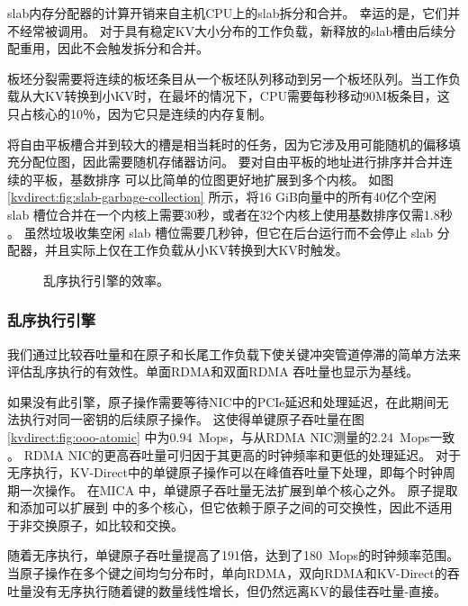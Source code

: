 slab内存分配器的计算开销来自主机CPU上的slab拆分和合并。
幸运的是，它们并不经常被调用。
对于具有稳定KV大小分布的工作负载，新释放的slab槽由后续分配重用，因此不会触发拆分和合并。

板坯分裂需要将连续的板坯条目从一个板坯队列移动到另一个板坯队列。当工作负载从大KV转换到小KV时，在最坏的情况下，CPU需要每秒移动90M板条目，这只占核心的10％，因为它只是连续的内存复制。

将自由平板槽合并到较大的槽是相当耗时的任务，因为它涉及用可能随机的偏移填充分配位图，因此需要随机存储器访问。
要对自由平板的地址进行排序并合并连续的平板，基数排序 \cite {satish2010fast} 可以比简单的位图更好地扩展到多个内核。
如图\ref {kvdirect:fig:slab-garbage-collection} 所示，将16 GiB向量中的所有40亿个空闲 slab 槽位合并在一个内核上需要30秒，或者在32个内核上使用基数排序仅需1.8秒 \cite{satish2010fast}。
虽然垃圾收集空闲 slab 槽位需要几秒钟，但它在后台运行而不会停止 slab 分配器，并且实际上仅在工作负载从小KV转换到大KV时触发。

\begin{figure}[t]
\centering
{}
\caption{乱序执行引擎的效率。}
\label{kvdirect:fig:ooo-eval}

\end{figure}


\subsubsection{乱序执行引擎}
\label{kvdirect:sec:ooo-eval}

我们通过比较吞吐量和在原子和长尾工作负载下使关键冲突管道停滞的简单方法来评估乱序执行的有效性。单面RDMA和双面RDMA \cite {kalia2016design}吞吐量也显示为基线。

如果没有此引擎，原子操作需要等待NIC中的PCIe延迟和处理延迟，在此期间无法执行对同一密钥的后续原子操作。
这使得单键原子吞吐量在图 \ref{kvdirect:fig:ooo-atomic} 中为0.94~Mops，与从RDMA NIC测量的2.24~Mops一致 \cite {kalia2016design}。
RDMA NIC的更高吞吐量可归因于其更高的时钟频率和更低的处理延迟。
对于无序执行，KV-Direct中的单键原子操作可以在峰值吞吐量下处理，即每个时钟周期一次操作。
在MICA \cite {lim2014mica} 中，单键原子吞吐量无法扩展到单个核心之外。
原子提取和添加可以扩展到 \cite {kalia2016design} 中的多个核心，但它依赖于原子之间的可交换性，因此不适用于非交换原子，如比较和交换。

随着无序执行，单键原子吞吐量提高了191倍，达到了180~Mops的时钟频率范围。
当原子操作在多个键之间均匀分布时，单向RDMA，双向RDMA和KV-Direct的吞吐量没有无序执行随着键的数量线性增长，但仍然远离KV的最佳吞吐量-直接。

